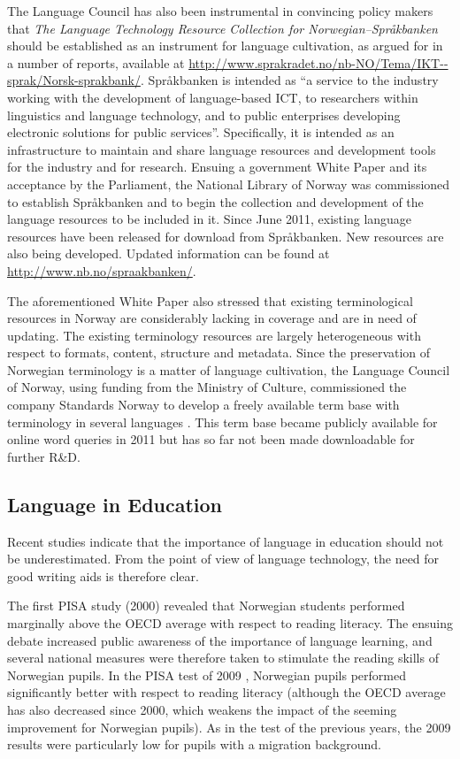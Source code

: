 \begin{multicols}{2}
The Language Council has also been instrumental in convincing policy makers that \textit{The Language Technology Resource Collection for Norwegian--Språkbanken} should be established as an instrument for language cultivation, as argued for in a number of reports, available at \url{http://www.sprakradet.no/nb-NO/Tema/IKT--sprak/Norsk-sprakbank/}.
Språkbanken is intended as “a service to the industry working with the development of language-based ICT, to researchers within linguistics and language technology, and to public enterprises developing electronic solutions for public services”. 
Specifically, it is intended as an infrastructure to maintain and share language resources and development tools for the industry and for research. 
Ensuing a government White Paper \cite{stm35:2008} and its acceptance by the Parliament, the National Library of Norway was commissioned to establish Språkbanken and to begin the collection and development of the language resources to be included in it.
Since June 2011, existing language resources have been released for download from Språkbanken.
New resources are also being developed. 
Updated information can be found at \url{http://www.nb.no/spraakbanken/}.

The aforementioned White Paper also stressed that existing terminological resources in Norway are considerably lacking in coverage and are in need of updating. 
The existing terminology resources are largely heterogeneous with respect to formats, content, structure and metadata. 
Since the preservation of Norwegian terminology is a matter of language cultivation, the Language Council of Norway, using funding from the Ministry of Culture, commissioned the company Standards Norway to develop a freely available term base with terminology in several languages \cite{drosdal2010}.
This term base became publicly available for online word queries in 2011 but has so far not been made downloadable for further R\&D.

\subsection{Language in Education}

Recent studies indicate that the importance of language in education should not be underestimated.
From the point of view of language technology, the need for good writing aids is therefore clear.


The first PISA study (2000) revealed that Norwegian students performed marginally above the OECD average with respect to reading literacy. 
The ensuing debate increased public awareness of the importance of language learning, and several national measures were therefore taken to stimulate the reading skills of Norwegian pupils. 
In the PISA test of 2009 \cite{pisa2009eng}, Norwegian pupils performed significantly better with respect to reading literacy (although the OECD average has also decreased since 2000, which weakens the impact of the seeming improvement for Norwegian pupils). 
As in the test of the previous years, the 2009 results were particularly low for pupils with a migration background. 


\end{multicols}
